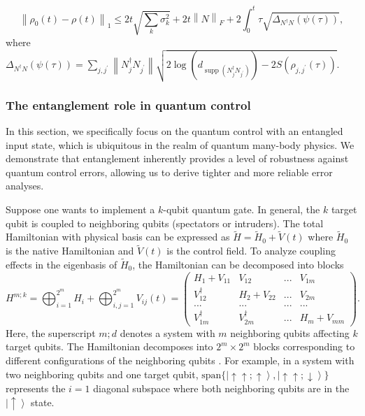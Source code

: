 \documentclass[12pt]{article}
\newcommand{\norm}[1]{\left\lVert #1\right\rVert}
\DeclareMathOperator{\support}{supp}
\begin{document}
\begin{equation}
    \norm{ \rho_0(t)-\rho(t) }_1\le 2t \sqrt{\sum_k \sigma^2_k}+ 2t\norm{N}_F+2 \int_0^t \tau \sqrt{\Delta_{N^\dagger N}(\psi(\tau))},
\end{equation}
where $\Delta_{N^\dagger N}(\psi(\tau))=\sum_{j,j^\prime} \norm{{N}^\dagger_j{N}_{j^\prime}}\sqrt{2 \log (d_{\support({N}^\dagger_j{N}_{j^\prime})})-2S(\rho_{j,j^\prime}(\tau))}$.


\subsubsection*{The entanglement role in quantum control}


In this section, we specifically focus on the quantum control with an entangled input state, which is ubiquitous in the realm of quantum many-body physics. We demonstrate that entanglement inherently provides a level of robustness against quantum control errors, allowing us to derive tighter and more reliable error analyses.









Suppose one wants to implement a $k$-qubit quantum gate. In general, the $k$ target qubit is coupled to neighboring qubits (spectators or intruders). The total Hamiltonian with physical basis can be expressed as   $\tilde{H}=\tilde{H}_0+\tilde{V}(t)$ where $\tilde{H}_0$ is the native Hamiltonian and $\tilde{V}(t)$ is the control field.
To analyze coupling effects in the eigenbasis  of $\tilde{H}_0$, the Hamiltonian can be decomposed into blocks \cite{hai2025scalablerobustquantumcontrol}
\begin{equation}
H^{m;k} = \bigoplus_{i=1}^{2^m} H_i + \bigoplus_{i,j=1}^{2^m} V_{ij}(t)=\begin{pmatrix}
            H_1 + V_{11} & V_{12} & ... & V_{1m} \\
            V^\dagger_{12} & H_2 + V_{22}& ... & V_{2m} \\
            ... & ... & ... & ...\\
            V^\dagger_{1m} & V^\dagger_{2m}  & ... & H_m +V_{mm}
           \end{pmatrix}.   
           \label{Eq_GeneralHsupp}
\end{equation}
Here, the superscript $m;d$ denotes a system with $m$ neighboring qubits affecting $k$ target qubits. The Hamiltonian decomposes into $2^m\times2^m$ blocks corresponding to different configurations of the neighboring qubits . For example, in a system with two neighboring qubits and one target qubit, $\text{span}\{\left|\uparrow\uparrow;\uparrow\right\rangle, \left|\uparrow\uparrow;\downarrow\right\rangle\}$ represents the $i=1$ diagonal subspace where both neighboring qubits are in the $\left|\uparrow\right\rangle$ state.
\end{document}
